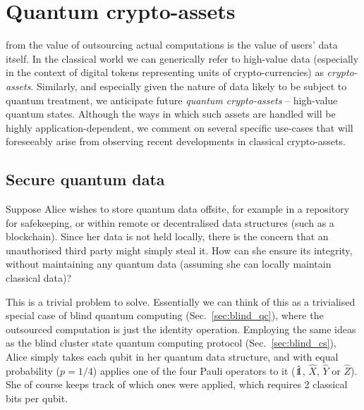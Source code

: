 %
%

\section{Quantum crypto-assets}\label{sec:quantum_crypto_assets}

 from the value of outsourcing actual computations is the value of users' data itself. In the classical world we can generically refer to high-value data (especially in the context of digital tokens representing units of crypto-currencies) as \textit{crypto-assets}. Similarly, and especially given the nature of data likely to be subject to quantum treatment, we anticipate future \textit{quantum crypto-assets} -- high-value quantum states. Although the ways in which such assets are handled will be highly application-dependent, we comment on several specific use-cases that will foreseeably arise from observing recent developments in classical crypto-assets.


\subsection{Secure quantum data}\label{sec:secure_quantum_date}

Suppose Alice wishes to store quantum data offsite, for example in a repository for safekeeping, or within remote or decentralised data structures (such as a blockchain). Since her data is not held locally, there is the concern that an unauthorised third party might simply steal it. How can she ensure its integrity, without maintaining any quantum data (assuming she can locally maintain classical data)?

This is a trivial problem to solve. Essentially we can think of this as a trivialised special case of blind quantum computing (Sec.~\ref{sec:blind_qc}), where the outsourced computation is just the identity operation. Employing the same ideas as the blind cluster state quantum computing protocol (Sec.~\ref{sec:blind_cs}), Alice simply takes each qubit in her quantum data structure, and with equal probability (\mbox{$p=1/4$}) applies one of the four Pauli operators to it ($\hat\openone$, $\hat{X}$, $\hat{Y}$ or $\hat{Z}$). She of course keeps track of which ones were applied, which requires 2 classical bits per qubit.

